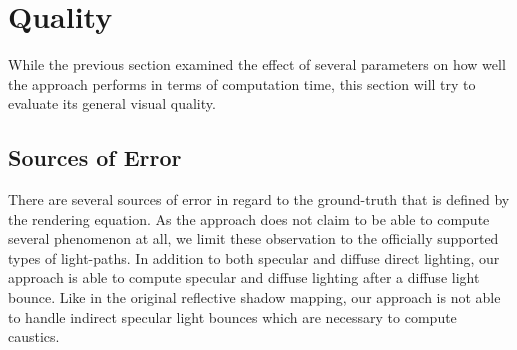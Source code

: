 \documentclass[thesis.tex]{subfiles}
\begin{document}
\newpage
\section{Quality}
While the previous section examined the effect of several parameters on how well the approach performs in terms of computation time, this section will try to evaluate its general visual quality.

\subsection{Sources of Error} \label{sec:eva:errorsources}
There are several sources of error in regard to the ground-truth that is defined by the rendering equation.
As the approach does not claim to be able to compute several phenomenon at all, we limit these observation to the officially supported types of light-paths.
In addition to both specular and diffuse direct lighting, our approach is able to compute specular and diffuse lighting after a diffuse light bounce.
Like in the original reflective shadow mapping, our approach is not able to handle indirect specular light bounces which are necessary to compute caustics.
\end{document}
